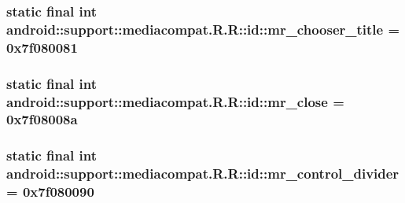 \hypertarget{classandroid_1_1support_1_1mediacompat_1_1_r_1_1id_4e216227a1329dea42ff8f071956a40a}{
\subsubsection[{mr\_\-chooser\_\-title}]{\setlength{\rightskip}{0pt plus 5cm}static final int android::support::mediacompat.R.R::id::mr\_\-chooser\_\-title = 0x7f080081}}
\label{classandroid_1_1support_1_1mediacompat_1_1_r_1_1id_4e216227a1329dea42ff8f071956a40a}


\hypertarget{classandroid_1_1support_1_1mediacompat_1_1_r_1_1id_d146aeae9e7234b71dcfeda0b27ffbea}{
\subsubsection[{mr\_\-close}]{\setlength{\rightskip}{0pt plus 5cm}static final int android::support::mediacompat.R.R::id::mr\_\-close = 0x7f08008a}}
\label{classandroid_1_1support_1_1mediacompat_1_1_r_1_1id_d146aeae9e7234b71dcfeda0b27ffbea}


\hypertarget{classandroid_1_1support_1_1mediacompat_1_1_r_1_1id_0cde530dca5ab9b1303557c23a6c9f0b}{
\subsubsection[{mr\_\-control\_\-divider}]{\setlength{\rightskip}{0pt plus 5cm}static final int android::support::mediacompat.R.R::id::mr\_\-control\_\-divider = 0x7f080090}}
\label{classandroid_1_1support_1_1mediacompat_1_1_r_1_1id_0cde530dca5ab9b1303557c23a6c9f0b}



